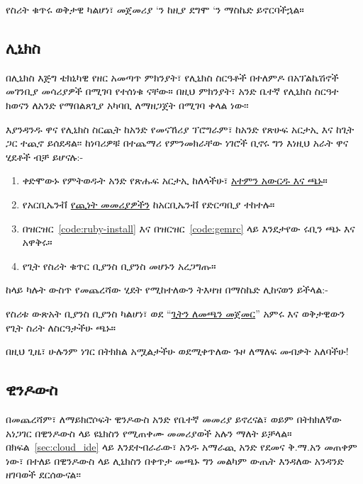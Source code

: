 \noindent የስሪት ቁጥሩ ወቅታዊ ካልሆነ፣ መጀመሪያ  `ን ከዚያ ደግሞ  `ን ማስኬድ ይኖርባችኋል።



\subsection{ሊኒክስ} %
\label{sec:linux}

በሊኒክስ እጅግ ቴክኒካዊ የዘር አመጣጥ ምክንያት፣ የሊኒክስ ስርዓቶች በተለምዶ በአፕልኬሽኖች መገንቢያ መሳሪያዎች በሚገባ የተሰነቁ ናቸው። በዚህ ምክንያት፣ አንድ ቤተኛ የሊኒክስ ስርዓተ ክወናን ለአንድ የማበልጸጊያ አካባቢ ለማዘጋጀት በሚገባ ቀላል ነው፡፡

እያንዳንዱ ዋና የሊኒክስ ስርጪት ከአንድ የመናኸሪያ ፕሮግራም፣ ከአንድ የጽሁፍ አርታኢ እና ከጊት ጋር ተጪኖ ይሰደዳል፡፡ ከነባሪዎቹ በተጨማሪ የምንመክራቸው ነገሮች ቢኖሩ ግን እነዚህ አራት ዋና ሂደቶች ብቻ ይሆናሉ:-
\begin{enumerate}
  \item ቀድሞውኑ የምትወዱት አንድ የጽሑፍ አርታኢ ከለላችሁ፣ \href{https://atom.io/}{አተምን አውርዱ እና ጫኑ}።
  \item የአርቢኤንቭ \href{https://github.com/rbenv/rbenv#installation}{የጪነት መመሪያዎችን} ከአርቢኤንቭ የድርጣቢያ ተከተሉ።
  \item በዝርዝር~\ref{code:ruby-install} እና በዝርዝር~\ref{code:gemrc} ላይ እንደታየው ሩቢን ጫኑ እና አዋቅሩ።
  \item የጊት የስሪት ቁጥር ቢያንስ ቢያንስ  መሆኑን አረጋግጡ።
\end{enumerate}

ከላይ ካሉት ውስጥ የመጨረሻው ሂደት የሚከተለውን ትእዛዝ በማስኬድ ሊከናወን ይችላል:-


\noindent የስሪቱ ውጽአት ቢያንስ ቢያንስ  ካልሆነ፣ ወደ  ``\href{https://git-scm.com/book/en/v2/Getting-Started-Installing-Git}{ጊትን ለመጫን መጀመር}'' አምሩ እና ወቅታዊውን የጊት ስሪት ለስርዓታችሁ ጫኑ።

በዚህ ጊዜ፣ ሁሉንም ነገር በትክክል አሟልታችሁ ወደሚቀጥለው ጉዞ ለማለፍ መብቃት አለባችሁ!


\subsection{ዊንዶውስ} %
\label{sec:windows}

በመጨረሻም፣ ለማይክሮሶፍት ዊንዶውስ አንድ የቤተኛ መመሪያ ይኖረናል፣ ወይም በትክክለኛው አነጋገር በዊንዶውስ ላይ ዩኒክስን የሚጠቀሙ መመሪያወች አሉን ማለት ይቻላል። በክፍል~\ref{sec:cloud_ide} ላይ እንደተብራራው፣ አንዱ አማራጪ አንድ የደመና ቅ.ማ.አን መጠቀም ነው፣ በተለይ በዊንዶውስ ላይ ሊኒክስን በቀጥታ መጫኑ ግን መልካም ውጤት እንዳለው አንዳንድ ዘገባወች ደርሰውናል፡፡

